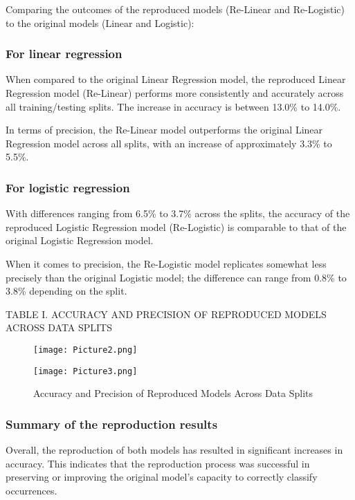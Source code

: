 \documentclass[conference]{IEEEtran}
\begin{document}
Comparing the outcomes of the reproduced models (Re-Linear and Re-Logistic) to the original models (Linear and Logistic):

\subsubsection{For linear regression}

When compared to the original Linear Regression model, the reproduced Linear Regression model (Re-Linear) performs more consistently and accurately across all training/testing splits. The increase in accuracy is between 13.0\% to 14.0\%.

In terms of precision, the Re-Linear model outperforms the original Linear Regression model across all splits, with an increase of approximately 3.3\% to 5.5\%.

\subsubsection{For logistic regression}

With differences ranging from 6.5\% to 3.7\% across the splits, the accuracy of the reproduced Logistic Regression model (Re-Logistic) is comparable to that of the original Logistic Regression model.

When it comes to precision, the Re-Logistic model replicates somewhat less precisely than the original Logistic model; the difference can range from 0.8\% to 3.8\% depending on the split.

TABLE I. ACCURACY AND PRECISION OF REPRODUCED MODELS ACROSS DATA SPLITS

\begin{figure}[h]
    \centering
    \texttt{[image: Picture2.png]}
\end{figure}

\begin{figure}[h]
    \centering
    \texttt{[image: Picture3.png]}
    \caption{Accuracy and Precision of Reproduced Models Across Data Splits}
    \label{fig:enter-label}
\end{figure}

\subsubsection{Summary of the reproduction results}

Overall, the reproduction of both models has resulted in significant increases in accuracy. This indicates that the reproduction process was successful in preserving or improving the original model's capacity to correctly classify occurrences.
\end{document}
